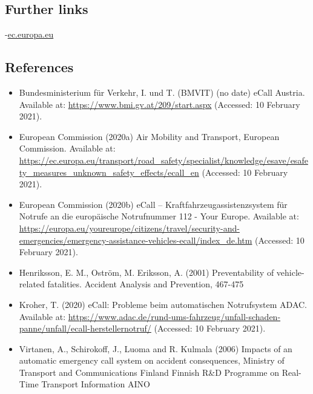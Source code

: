 \documentclass[
]{book}
\providecommand{\tightlist}{%
  \setlength{\itemsep}{0pt}\setlength{\parskip}{0pt}}
\begin{document}
\hypertarget{further-links-15}{%
\subsection*{Further links}\label{further-links-15}}

-\href{https://ec.europa.eu/transport/road_safety/specialist/knowledge/esave/esafety_measures_unknown_safety_effects/ecall_en}{ec.europa.eu}

\hypertarget{references-18}{%
\subsection*{References}\label{references-18}}

\begin{itemize}
\tightlist
\item
  Bundesministerium für Verkehr, I. und T. (BMVIT) (no date) eCall Austria. Available at: \url{https://www.bmi.gv.at/209/start.aspx} (Accessed: 10 February 2021).
\item
  European Commission (2020a) Air \textbar{} Mobility and Transport, European Commission. Available at: \url{https://ec.europa.eu/transport/road_safety/specialist/knowledge/esave/esafety_measures_unknown_safety_effects/ecall_en} (Accessed: 10 February 2021).
\item
  European Commission (2020b) eCall -- Kraftfahrzeugassistenzsystem für Notrufe an die europäische Notrufnummer 112 - Your Europe. Available at: \url{https://europa.eu/youreurope/citizens/travel/security-and-emergencies/emergency-assistance-vehicles-ecall/index_de.htm} (Accessed: 10 February 2021).
\item
  Henriksson, E. M., Oström, M. Eriksson, A. (2001) Preventability of vehicle-related fatalities. Accident Analysis and Prevention, 467-475
\item
  Kroher, T. (2020) eCall: Probleme beim automatischen Notrufsystem \textbar{} ADAC. Available at: \url{https://www.adac.de/rund-ums-fahrzeug/unfall-schaden-panne/unfall/ecall-herstellernotruf/} (Accessed: 10 February 2021).
\item
  Virtanen, A., Schirokoff, J., Luoma and R. Kulmala (2006) Impacts of an automatic emergency call system on accident consequences, Ministry of Transport and Communications Finland Finnish R\&D Programme on Real-Time Transport Information AINO
\end{itemize}
\end{document}
